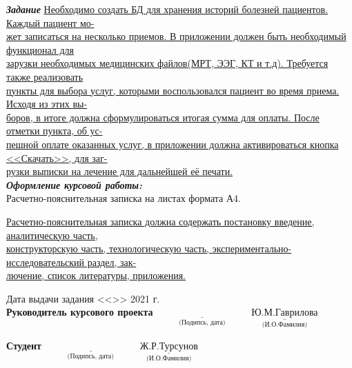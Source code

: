 \documentclass[a4paper, 10pt]{article}
\begin{document}
\begin{titlepage}
	\normalsize {{ \textbf{\textit{Задание}}} \underline{Необходимо создать БД для хранения историй болезней пациентов. Каждый пациент мо-\hspace*{2mm}} \\ \underline{жет записаться на несколько приемов. В приложении должен быть необходимый функционал для\hspace*{3mm}} \\ \underline{зарузки необходимых медицинских файлов(МРТ, ЭЭГ, КТ и т.д). Требуется также реализовать\hspace*{6.7mm}} \\ \underline{пункты для выбора услуг, которыми воспользовался пациент во время приема. Исходя из этих вы-\hspace*{2mm}} \\ \underline{боров, в итоге должна сформулироваться итогая сумма для оплаты. После отметки пункта, об ус-\hspace*{3mm}} \\ \underline{пешной оплате оказанных услуг, в приложении должна активироваться кнопка <<Скачать>>, для заг-} \\ \underline{рузки выписки на лечение для дальнейшей её печати. \hspace*{73mm}}}
	\\ \normalsize {{\textbf{\textit{Оформление курсовой работы:}}}}
	\\ Расчетно-пояснительная записка на \underline{\hspace*{0.5cm}} листах формата А4.
	
	\underline{Расчетно-пояснительная записка должна содержать постановку введение, аналитическую часть,} \\ \underline{конструкторскую часть, технологическую часть, экспериментально-исследовательский раздел, зак-} \\ \underline{лючение, список литературы, приложения.}
	
	\begin{flushleft}
		\small Дата выдачи задания <<\underline{\hspace{1cm}}>> \underline{\hspace{3cm}} 2021 г.
		\newline
		\\ \small \textbf{Руководитель курсового проекта}
		\small \hspace{3cm}$\underset{\text{(Подипсь, дата)}}{\underline{\hspace{4cm}}}$ 
		\small \hspace{4mm}$\underset{\text{(И.О.Фамилия)}}{\underline{\text{Ю.М.Гаврилова}}}$ 
	\end{flushleft}
	\begin{flushleft}
		\small \textbf{Студент}
		\small \hspace{7.2cm}$\underset{\text{(Подипсь, дата)}}{\underline{\hspace{4cm}}}$ 
		\small \hspace{5mm}$\underset{\text{(И.О.Фамилия)}}{\underline{\text{Ж.Р.Турсунов}}}$ 
	\end{flushleft}
	
\end{titlepage}
\setcounter{page}{3}
\tableofcontents
\clearpage
\newpage
\end{document}
